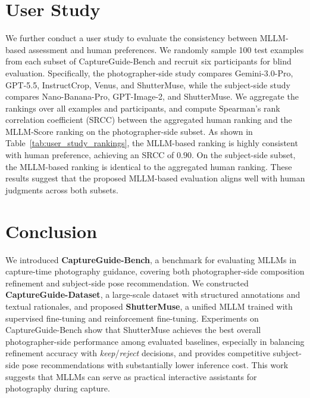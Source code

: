\documentclass{article} %
\begin{document}
\section{User Study}
We further conduct a user study to evaluate the consistency between MLLM-based assessment and human preferences. We randomly sample 100 test examples from each subset of CaptureGuide-Bench and recruit six participants for blind evaluation. Specifically, the photographer-side study compares Gemini-3.0-Pro, GPT-5.5, InstructCrop, Venus, and ShutterMuse, while the subject-side study compares Nano-Banana-Pro, GPT-Image-2, and ShutterMuse. We aggregate the rankings over all examples and participants, and compute Spearman's rank correlation coefficient (SRCC) between the aggregated human ranking and the MLLM-Score ranking on the photographer-side subset. As shown in Table~\ref{tab:user_study_rankings}, the MLLM-based ranking is highly consistent with human preference, achieving an SRCC of $0.90$. On the subject-side subset, the MLLM-based ranking is identical to the aggregated human ranking. These results suggest that the proposed MLLM-based evaluation aligns well with human judgments across both subsets.
\section{Conclusion}

We introduced \textbf{CaptureGuide-Bench}, a benchmark for evaluating MLLMs in capture-time photography guidance, covering both photographer-side composition refinement and subject-side pose recommendation. We constructed \textbf{CaptureGuide-Dataset}, a large-scale dataset with structured annotations and textual rationales, and proposed \textbf{ShutterMuse}, a unified MLLM trained with supervised fine-tuning and reinforcement fine-tuning. Experiments on CaptureGuide-Bench show that ShutterMuse achieves the best overall photographer-side performance among evaluated baselines, especially in balancing refinement accuracy with \textit{keep}/\textit{reject} decisions, and provides competitive subject-side pose recommendations with substantially lower inference cost. This work suggests that MLLMs can serve as practical interactive assistants for photography during capture.

\end{document}
